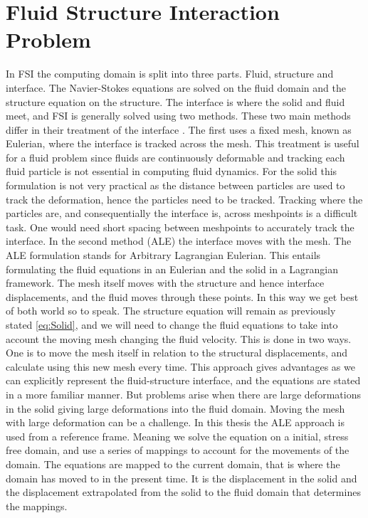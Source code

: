 \chapter{Fluid Structure Interaction Problem}
In FSI the computing domain is split into three parts. Fluid, structure and interface. The Navier-Stokes equations are solved on the fluid domain and the structure equation on the structure. The interface is where the solid and fluid meet, and FSI is generally solved using two methods. These two main methods differ in their treatment of the interface \cite{Liu2014}. The first uses a fixed mesh, known as Eulerian, where the interface is tracked across the mesh. This treatment is useful for a fluid problem since fluids are continuously deformable and tracking each fluid particle is not essential in computing fluid dynamics. For the solid this formulation is not very practical as the distance between particles are used to track the deformation, hence the particles need to be tracked. Tracking where the particles are, and consequentially the interface is, across meshpoints is a difficult task. One would need short spacing between meshpoints to accurately track the interface. In the second method (ALE) the interface moves with the mesh. 
The ALE formulation stands for Arbitrary Lagrangian Eulerian. This entails formulating the fluid equations in an Eulerian and the solid in a Lagrangian framework. The mesh itself moves with the structure and hence interface displacements, and the fluid moves through these points. In this way we get best of both world so to speak. The structure equation will remain as previously stated \eqref{eq:Solid}, and we will need to change the fluid equations to take into account the moving mesh changing the fluid velocity. This is done in two ways. One is to move the mesh itself in relation to the structural displacements, and calculate using this new mesh every time. 
This approach gives advantages as we can explicitly represent the fluid-structure interface, and the equations are stated in a more familiar manner. But problems arise when there are large deformations in the solid giving large deformations into the fluid domain. Moving the mesh with large deformation can be a challenge. 
In this thesis the ALE approach is used from a reference frame.
Meaning we solve the equation on a initial, stress free domain, and use a series of mappings to account for the movements of the domain. The equations are mapped to the current domain, that is where the domain has moved to in the present time. It is the displacement in the solid and the displacement extrapolated from the solid to the fluid domain that determines the mappings. 
